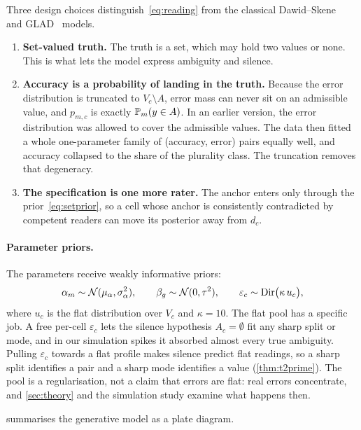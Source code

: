 Three design choices distinguish~\eqref{eq:reading} from the classical Dawid--Skene~\cite{dawid1979maximum} and GLAD~\cite{whitehill2009whose} models.
\begin{enumerate}[leftmargin=*,label=(\roman*)]
\item \textbf{Set-valued truth.} The truth is a set, which may hold two values or none. This is what lets the model express ambiguity and silence.
\item \textbf{Accuracy is a probability of landing in the truth.} Because the error distribution is truncated to $V_c\setminus A$, error mass can never sit on an admissible value, and $p_{m,c}$ is exactly $\mathbb{P}_m(y\in A)$. In an earlier version, the error distribution was allowed to cover the admissible values. The data then fitted a whole one-parameter family of (accuracy, error) pairs equally well, and accuracy collapsed to the share of the plurality class. The truncation removes that degeneracy.
\item \textbf{The specification is one more rater.} The anchor enters only through the prior~\eqref{eq:setprior}, so a cell whose anchor is consistently contradicted by competent readers can move its posterior away from $d_c$.
\end{enumerate}

\paragraph{Parameter priors.} The parameters receive weakly informative priors:
\begin{equation}
\label{eq:paramprior}
\alpha_m\sim\mathcal{N}(\mu_\alpha,\sigma_\alpha^2),\qquad
\beta_g\sim\mathcal{N}(0,\tau^2),\qquad
\varepsilon_c\sim\mathrm{Dir}\bigl(\kappa\,u_c\bigr),
\end{equation}
where $u_c$ is the flat distribution over $V_c$ and $\kappa=10$. The flat pool has a specific job. A free per-cell $\varepsilon_c$ lets the silence hypothesis $A_c=\emptyset$ fit any sharp split or mode, and in our simulation spikes it absorbed almost every true ambiguity. Pulling $\varepsilon_c$ towards a flat profile makes silence predict flat readings, so a sharp split identifies a pair and a sharp mode identifies a value (\cref{thm:t2prime}). The pool is a regularisation, not a claim that errors are flat: real errors concentrate, and \cref{sec:theory} and the simulation study examine what happens then.

 summarises the generative model as a plate diagram.

